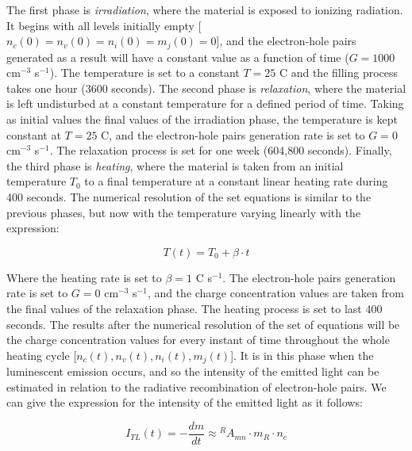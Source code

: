 \vspace{10pt}
The first phase is \textit{irradiation}, where the material is exposed to ionizing radiation. It begins with all levels initially empty [$n_c(0) = n_v(0) = n_i(0) = m_j(0) = 0$], and the electron-hole pairs generated as a result will have a constant value as a function of time ($G = 1000$ cm$^{-3}$ s$^{-1}$). The temperature is set to a constant $T = 25$ \textdegree C and the filling process takes one hour (3600 seconds). The second phase is \textit{relaxation}, where the material is left undisturbed at a constant temperature for a defined period of time. Taking as initial values the final values of the irradiation phase, the temperature is kept constant at $T = 25$ \textdegree C, and the electron-hole pairs generation rate is set to $G = 0$ cm$^{-3}$ s$^{-1}$. The relaxation process is set for one week (604,800 seconds). Finally, the third phase is \textit{heating}, where the material is taken from an initial temperature $T_0$ to a final temperature at a constant linear heating rate during 400 seconds. The numerical resolution of the set equations is similar to the previous phases, but now with the temperature varying linearly with the expression:

\begin{equation} \label{eq:heating}
  T(t) = T_0 + \beta \cdot t
\end{equation}

\vspace{7pt}
Where the heating rate is set to $\beta = 1 $ \textdegree C s$^{-1}$. The electron-hole pairs generation rate is set to $G = 0$ cm$^{-3}$ s$^{-1}$, and the charge concentration values are taken from the final values of the relaxation phase. The heating process is set to last 400 seconds. The results after the numerical resolution of the set of equations will be the charge concentration values for every instant of time throughout the whole heating cycle [$n_c(t), n_v(t), n_i(t), m_j(t)$]. It is in this phase when the luminescent emission occurs, and so the intensity of the emitted light can be estimated in relation to the radiative recombination of electron-hole pairs. We can give the expression for the intensity of the emitted light as it follows:

\begin{equation} \label{eq:intensity}
  I_{T\!L}(t) = -\frac{dm}{dt} \approx {}^RA_{mn} \cdot m_R \cdot n_c
\end{equation}

\vspace{7pt}

